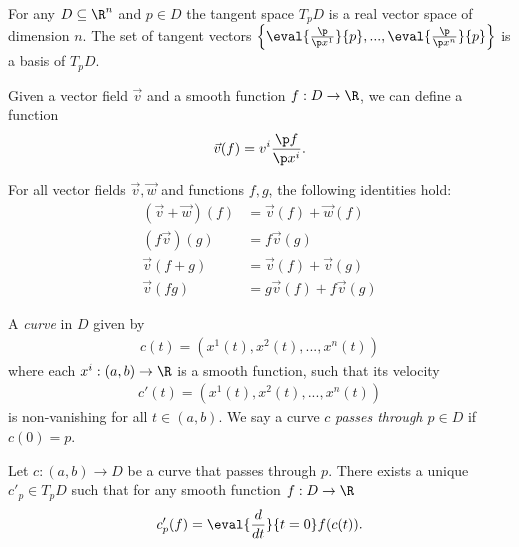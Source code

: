 \documentclass{article}
\begin{document}
\begin{theorem}[Notes 4.4]
    For any $D\subseteq \R^n$ and $p\in D$ the tangent space $T_pD$ is a real vector space
    of dimension $n$. The set of tangent vectors
    $\left\lbrace\eval{\frac{\p }{\p x^1}}{p}, ...,\eval{\frac{\p }{\p x^n}}{p}\right\rbrace$
    is a basis of $T_pD$.
\end{theorem}

\begin{definition}
    Given a vector field $\vec v$ and a smooth function $f:D\to\R$,
    we can define a function
    \begin{align*}
        \vec v(f) = v^i\frac{\p f}{\p x^i}.
    \end{align*}
\end{definition}

\begin{proposition}[Notes 4.7]
    For all vector fields $\vec v,\vec w$ and functions $f,g$, the following identities hold:
    \begin{align*}
        (\vec v+\vec w)(f) & = \vec v(f) + \vec w(f)   \\
        (f\vec v)(g)       & = f\vec v(g)              \\
        \vec v(f+g)        & = \vec v(f) + \vec v(g)   \\
        \vec v(fg)         & = g\vec v(f) + f\vec v(g)
    \end{align*}
\end{proposition}

\begin{definition}
    A \emph{curve} in $D$ given by
    \begin{align*}
        c(t) = (x^1(t), x^2(t), ..., x^n(t))
    \end{align*}
    where each $x^i:(a,b)\to\R$ is a smooth function, such that its velocity
    \begin{align*}
        c'(t)=(x^1(t), x^2(t), ..., x^n(t))
    \end{align*}
    is non-vanishing for all $t\in(a,b)$.
    We say a curve $c$ \emph{passes through $p\in D$} if $c(0)=p$.
\end{definition}

\begin{proposition}[Notes 4.9]
    Let $c:(a,b)\to D$ be a curve that passes through $p$. There exists a unique
    $c'_p\in T_p D$ such that for any smooth function $f:D\to\R$
    \begin{align*}
        c'_p(f) = \eval{\frac{d}{dt}}{t=0} f(c(t)).
    \end{align*}
\end{proposition}
\end{document}
